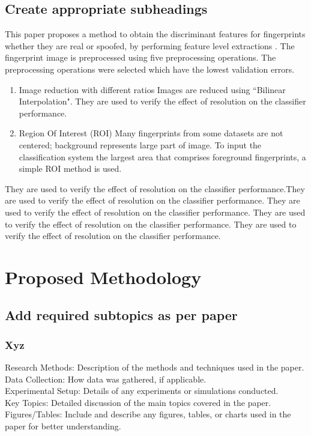 \section{Create appropriate subheadings}
This paper proposes a method to obtain the discriminant features for fingerprints whether they are real or spoofed, by performing feature level extractions \cite{10}. The fingerprint image is preprocessed using five preprocessing operations. The preprocessing operations were selected which have the lowest validation errors.
 \begin{enumerate}
\item Image reduction with different ratios Images are reduced using ``Bilinear Interpolation". They are used to verify the effect of resolution on the classifier performance. 
 \item Region Of Interest (ROI) Many fingerprints from some datasets are not centered; background represents large part of image. To input the classification system the largest area that comprises foreground fingerprints, a simple ROI method is used. 
\end{enumerate}
They are used to verify the effect of resolution on the classifier performance.They are used to verify the effect of resolution on the classifier performance. They are used to verify the effect of resolution on the classifier performance. They are used to verify the effect of resolution on the classifier performance. They are used to verify the effect of resolution on the classifier performance.
\chapter{Proposed Methodology}
\section{Add required subtopics as per paper}
\subsection{Xyz}
Research Methods: Description of the methods and techniques used in the paper.\\
Data Collection: How data was gathered, if applicable.\\
Experimental Setup: Details of any experiments or simulations conducted.\\
Key Topics: Detailed discussion of the main topics covered in the paper.\\
Figures/Tables: Include and describe any figures, tables, or charts used in the paper for better understanding.


